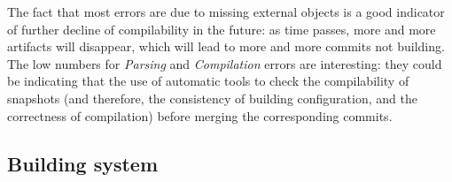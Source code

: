 
The fact that most errors are due to missing external objects is a good indicator of further decline of compilability in the future: as time passes, more and more artifacts will disappear, which will lead to more and more commits not building. The low numbers for \textit{Parsing} and \textit{Compilation} errors are interesting: they could be indicating that the use of automatic tools to check the compilability of snapshots (and therefore, the consistency of building configuration, and the correctness of compilation) before merging the corresponding commits.

\vspace{0.2cm}


\subsection{Building system}

